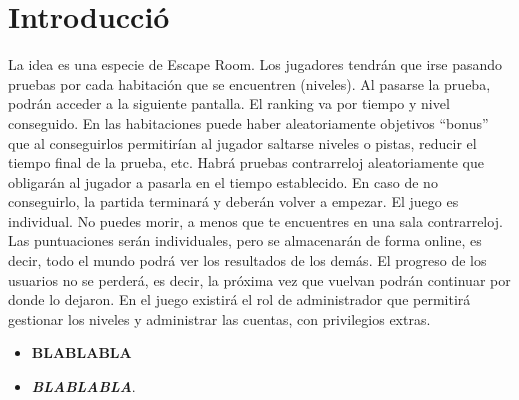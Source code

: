 \section{Introducció}\label{sec:intro}


La idea es una especie de Escape Room. Los jugadores tendrán que irse pasando pruebas por cada habitación que se encuentren (niveles). Al pasarse la prueba, podrán acceder a la siguiente pantalla. El ranking va por tiempo y nivel conseguido. En las habitaciones puede haber aleatoriamente objetivos “bonus” que al conseguirlos permitirían al jugador saltarse niveles o pistas, reducir el tiempo final de la prueba, etc.
Habrá pruebas contrarreloj aleatoriamente que obligarán al jugador a pasarla en el tiempo establecido. En caso de no conseguirlo, la partida terminará y deberán volver a empezar.
El juego es individual. No puedes morir, a menos que te encuentres en una sala contrarreloj. 
Las puntuaciones serán individuales, pero se almacenarán de forma online, es decir, todo el mundo podrá ver los resultados de los demás. 
El progreso de los usuarios no se perderá, es decir, la próxima vez que vuelvan podrán continuar por donde lo dejaron.
En el juego existirá el rol de administrador que permitirá gestionar los niveles y administrar las cuentas, con privilegios extras.


\begin{itemize}
\item  \textbf{BLABLABLA}
\item  \textit{\textbf{BLABLABLA}}.
\end{itemize}
